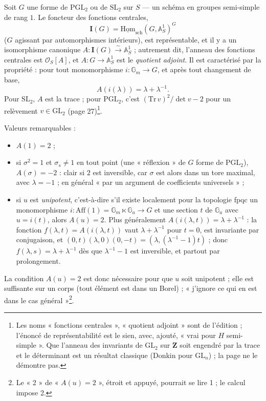 \documentclass[11pt,a4paper]{article}
\begin{document}
Soit $G$ une forme de $\mathrm{PGL}_2$ ou de $\mathrm{SL}_2$ sur $S$ ---
un schéma en groupes semi-simple de rang $1$. Le foncteur des fonctions
centrales,
\[
  \mathbf{I}(G) = \underline{\mathrm{Hom}}_{\mathrm{sch}}(G, \mathbb{A}^1_S)^{G}
\]
($G$ agissant par automorphismes intérieurs), est représentable, et il y a
un isomorphisme canonique $A : \mathbf{I}(G) \xrightarrow{\sim}
\mathbb{A}^1_S$ ; autrement dit, l'anneau des fonctions centrales est
$\mathcal{O}_S[A]$, et $A : G \to \mathbb{A}^1_S$ est le \emph{quotient
adjoint}. Il est caractérisé par la propriété : pour tout monomorphisme
$i : \mathbb{G}_m \to G$, et après tout changement de base,
\[
  A(i(\lambda)) = \lambda + \lambda^{-1} .
\]
Pour $\mathrm{SL}_2$, $A$ est la trace ; pour $\mathrm{PGL}_2$, c'est
$(\mathrm{Tr}\, v)^2/\det v - 2$ pour un relèvement $v \in \mathrm{GL}_2$
(page 27)\footnote{Les noms « fonctions centrales », « quotient adjoint » sont
de l'édition ; l'énoncé de représentabilité est le sien, avec, ajouté, « vrai
pour $H$ semi-simple ». Que l'anneau des invariants de $\mathrm{GL}_2$ sur
$\mathbf{Z}$ soit engendré par la trace et le déterminant est un résultat
classique (Donkin pour $\mathrm{GL}_n$) ; la page ne le démontre pas.}.

Valeurs remarquables :
\begin{itemize}
  \item $A(1) = 2$ ;
  \item si $\sigma^2 = 1$ et $\sigma_s \neq 1$ en tout point (une « réflexion »
    de $G$ forme de $\mathrm{PGL}_2$), $A(\sigma) = -2$ : clair si $2$ est
    inversible, car $\sigma$ est alors dans un tore maximal, avec $\lambda =
    -1$ ; en général « par un argument de coefficients universels » ;
  \item si $u$ est \emph{unipotent}, c'est-à-dire s'il existe localement pour
    la topologie fpqc un monomorphisme $i : \mathrm{Aff}(1) = \mathbb{G}_m
    \ltimes \mathbb{G}_a \to G$ et une section $t$ de $\mathbb{G}_a$ avec $u =
    i(t)$, alors $A(u) = 2$. Plus généralement $A(i(\lambda, t)) = \lambda +
    \lambda^{-1}$ : la fonction $f(\lambda, t) = A(i(\lambda, t))$ vaut
    $\lambda + \lambda^{-1}$ pour $t = 0$, est invariante par conjugaison, et
    $(0, t)(\lambda, 0)(0, -t) = (\lambda, (\lambda^{-1} - 1)t)$ ; donc
    $f(\lambda, s) = \lambda + \lambda^{-1}$ dès que $\lambda^{-1} - 1$ est
    inversible, et partout par prolongement.
\end{itemize}
La condition $A(u) = 2$ est donc nécessaire pour que $u$ soit unipotent ; elle
est suffisante sur un corps (tout élément est dans un Borel) ; « j'ignore ce
qui en est dans le cas général »\footnote{Le « 2 » de « $A(u) = 2$ », étroit et
appuyé, pourrait se lire 1 ; le calcul impose 2.}.
\end{document}
